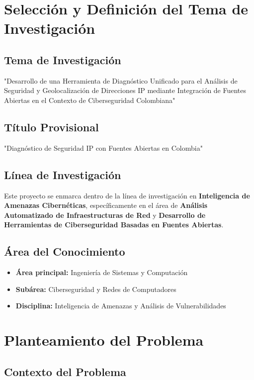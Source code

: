 \section{Selección y Definición del Tema de Investigación}

\subsection{Tema de Investigación}
"Desarrollo de una Herramienta de Diagnóstico Unificado para el Análisis de Seguridad y Geolocalización de Direcciones IP mediante Integración de Fuentes Abiertas en el Contexto de Ciberseguridad Colombiana"

\subsection{Título Provisional}
"Diagnóstico de Seguridad IP con Fuentes Abiertas en Colombia"

\subsection{Línea de Investigación}
Este proyecto se enmarca dentro de la línea de investigación en \textbf{Inteligencia de Amenazas Cibernéticas}, específicamente en el área de \textbf{Análisis Automatizado de Infraestructuras de Red} y \textbf{Desarrollo de Herramientas de Ciberseguridad Basadas en Fuentes Abiertas}.

\subsection{Área del Conocimiento}
\begin{itemize}
    \item \textbf{Área principal:} Ingeniería de Sistemas y Computación
    \item \textbf{Subárea:} Ciberseguridad y Redes de Computadores
    \item \textbf{Disciplina:} Inteligencia de Amenazas y Análisis de Vulnerabilidades
\end{itemize}

\section{Planteamiento del Problema}

\subsection{Contexto del Problema}

